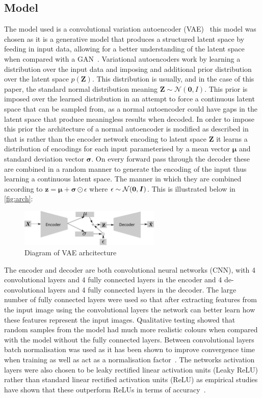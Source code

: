 \documentclass{article}
\begin{document}
\subsection{Model}
The model used is a convolutional variation autoencoder (VAE)~\cite{vae} this model was chosen as it is a generative model that produces a structured latent space by feeding in input data, allowing for a better understanding of the latent space when compared with a GAN~\cite{latent}. Variational autoencoders work by learning a distribution over the input data and imposing and additional prior distribution over the latent space $p(\bm{Z})$. This distribution is usually, and in the case of this paper, the standard normal distribution meaning $\bm{Z}\sim\mathcal{N}(\textbf{0}, \bm{\mathit{I}})$. This prior is imposed over the learned distribution in an attempt to force a continuous latent space that can be sampled from, as a normal autoencoder could have gaps in the latent space that produce meaningless results when decoded. In order to impose this prior the architecture of a normal autoencoder is modified as described in~\cite{vae} that is rather than the encoder network encoding to latent space $\bm{Z}$ it learns a distribution of encodings for each input parameterised by a mean vector $\bm{\mu}$ and standard deviation vector $\bm{\sigma}$. On every forward pass through the decoder these are combined in a random manner to generate the encoding of the input thus learning a continuous latent space. The manner in which they are combined according to $\bm{z}=\bm{\mu} +\bm{\sigma}\odot\epsilon$ where $\epsilon\sim\mathcal{N}(\bf{0}, \bm{\mathit{I}})$. This is illustrated below in \autoref{fig:arch}:
\begin{figure}[h]
    \centering
    \includegraphics[width=0.6\textwidth]{vae}
    \caption{Diagram of VAE arhcitecture}
    \label{fig:arch}
\end{figure}
\par
The encoder and decoder are both convolutional neural networks (CNN), with 4 convolutional layers and 4 fully connected layers in the encoder and 4 de-convolutional layers and 4 fully connected layers in the decoder. The large number of fully connected layers were used so that after extracting features from the input image using the convolutional layers the network can better learn how these features represent the input images. Qualitative testing showed that random samples from the model had much more realistic colours when compared with the model without the fully connected layers. Between convolutional layers batch normalisation was used as it has been shown to improve convergence time when training as well as act as a normalisation factor~\cite{batch}. The networks activation layers were also chosen to be leaky rectified linear activation units (Leaky ReLU) rather than standard linear rectified activation units (ReLU) as empirical studies have shown that these outperform ReLUs in terms of accuracy~\cite{relu}.
\end{document}
